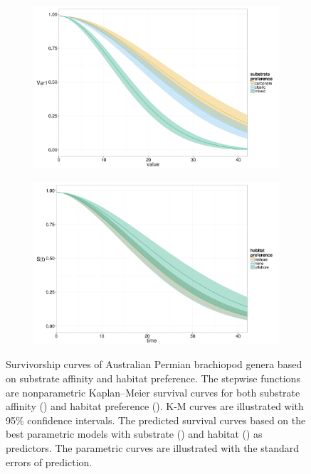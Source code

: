 \documentclass[12pt,letterpaper]{article}
\begin{document}
\begin{figure}[ht]
  \begin{subfigure}[b]{0.5\textwidth}
    \caption{}
    \includegraphics[height = 0.4\textheight, width = \textwidth, keepaspectratio = true]{figure/aff}
    \label{subfig:aff_surv}
  \end{subfigure}
  \begin{subfigure}[b]{0.5\textwidth}
    \caption{}
    \includegraphics[height = 0.4\textheight, width = \textwidth, keepaspectratio = true]{figure/hab}
    \label{subfig:env_surv}
  \end{subfigure}
  \caption[Brachiopod survival curves]{Survivorship curves of Australian Permian brachiopod genera based on substrate affinity and habitat preference. The stepwise functions are nonparametric Kaplan--Meier survival curves for both substrate affinity () and habitat preference (). K-M curves are illustrated with 95\% confidence intervals. The predicted survival curves based on the best parametric models with substrate () and habitat () as predictors. The parametric curves are illustrated with the standard errors of prediction.} 
  \label{fig:brach_surv}
\end{figure}
\end{document}
